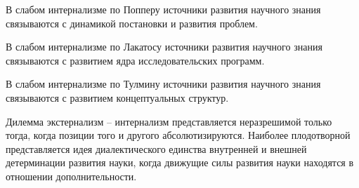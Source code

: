 \documentclass[exam_answers.tex]{subfiles}
\begin{document}
В слабом интернализме по Попперу источники развития научного знания связываются с динамикой постановки и развития проблем.

В слабом интернализме по Лакатосу источники развития научного знания связываются с развитием ядра исследовательских программ.

В слабом интернализме по Тулмину источники развития научного знания связываются с развитием концептуальных структур.

Дилемма экстернализм – интернализм представляется неразрешимой только тогда, когда позиции того и другого абсолютизируются.
Наиболее плодотворной представляется идея диалектического единства внутренней и внешней детерминации развития науки, когда движущие силы развития науки находятся в отношении дополнительности.
\end{document}
